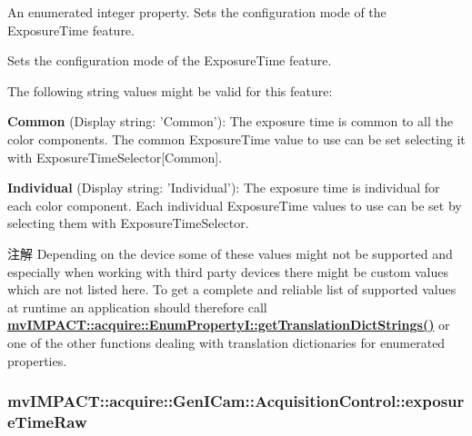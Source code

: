 An enumerated integer property. Sets the configuration mode of the Exposure\+Time feature. 

Sets the configuration mode of the Exposure\+Time feature.

The following string values might be valid for this feature\+:
\begin{DoxyItemize}
\item {\bfseries Common} (Display string\+: 'Common')\+: The exposure time is common to all the color components. The common Exposure\+Time value to use can be set selecting it with Exposure\+Time\+Selector\mbox{[}Common\mbox{]}.
\item {\bfseries Individual} (Display string\+: 'Individual')\+: The exposure time is individual for each color component. Each individual Exposure\+Time values to use can be set by selecting them with Exposure\+Time\+Selector.
\end{DoxyItemize}

\begin{DoxyNote}{注解}
Depending on the device some of these values might not be supported and especially when working with third party devices there might be custom values which are not listed here. To get a complete and reliable list of supported values at runtime an application should therefore call {\bfseries \hyperlink{classmv_i_m_p_a_c_t_1_1acquire_1_1_enum_property_i_a0ba6ccbf5ee69784d5d0b537924d26b6}{mv\+I\+M\+P\+A\+C\+T\+::acquire\+::\+Enum\+Property\+I\+::get\+Translation\+Dict\+Strings()}} or one of the other functions dealing with translation dictionaries for enumerated properties. 
\end{DoxyNote}
\hypertarget{classmv_i_m_p_a_c_t_1_1acquire_1_1_gen_i_cam_1_1_acquisition_control_aec552f1617c6891948e38f9aab39b760}{
\subsubsection[{exposure\+Time\+Raw}]{ mv\+I\+M\+P\+A\+C\+T\+::acquire\+::\+Gen\+I\+Cam\+::\+Acquisition\+Control\+::exposure\+Time\+Raw}}\label{classmv_i_m_p_a_c_t_1_1acquire_1_1_gen_i_cam_1_1_acquisition_control_aec552f1617c6891948e38f9aab39b760}


